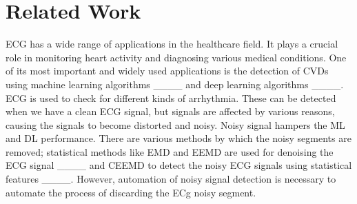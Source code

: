 \section{Related Work}
ECG has a wide range of applications in the healthcare field. It plays a crucial role in monitoring heart activity and diagnosing various medical conditions. One of its most important and widely used applications is the detection of CVDs using machine learning algorithms ____ and deep learning algorithms ____. ECG is used to check for different kinds of arrhythmia. These can be detected when we have a clean ECG signal, but signals are affected by various reasons, causing the signals to become distorted and noisy. Noisy signal hampers the ML and DL performance. There are various methods by which the noisy segments are removed; statistical methods like EMD and EEMD are used for denoising the ECG signal ____ and CEEMD to detect the noisy ECG signals using statistical features ____. However, automation of noisy signal detection is necessary to automate the process of discarding the ECg noisy segment. 


